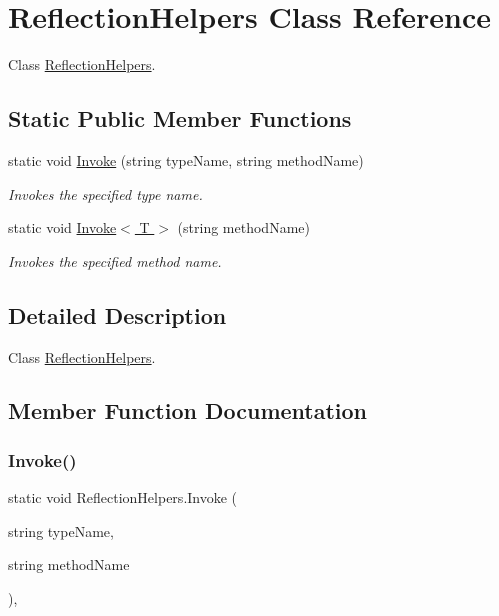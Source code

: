 \hypertarget{class_reflection_helpers}{}\section{Reflection\+Helpers Class Reference}
\label{class_reflection_helpers}


Class \hyperlink{class_reflection_helpers}{Reflection\+Helpers}.  


\subsection*{Static Public Member Functions}
\begin{DoxyCompactItemize}
\item 
static void \hyperlink{class_reflection_helpers_a5882e880330b999887bc73ec4c012cdc}{Invoke} (string type\+Name, string method\+Name)
\begin{DoxyCompactList}\small\item\em Invokes the specified type name. \end{DoxyCompactList}\item 
static void \hyperlink{class_reflection_helpers_a061fa976e2978c0446f68c012e9aef62}{Invoke$<$ T $>$} (string method\+Name)
\begin{DoxyCompactList}\small\item\em Invokes the specified method name. \end{DoxyCompactList}\end{DoxyCompactItemize}


\subsection{Detailed Description}
Class \hyperlink{class_reflection_helpers}{Reflection\+Helpers}. 



\subsection{Member Function Documentation}
\mbox{\label{class_reflection_helpers_a5882e880330b999887bc73ec4c012cdc}} 
\subsubsection{\texorpdfstring{Invoke()}{Invoke()}}
{\footnotesize\ttfamily static void Reflection\+Helpers.\+Invoke (\begin{DoxyParamCaption}\item[{string}]{type\+Name,  }\item[{string}]{method\+Name }\end{DoxyParamCaption})\hspace{0.3cm}{\ttfamily [inline]}, {\ttfamily [static]}}



